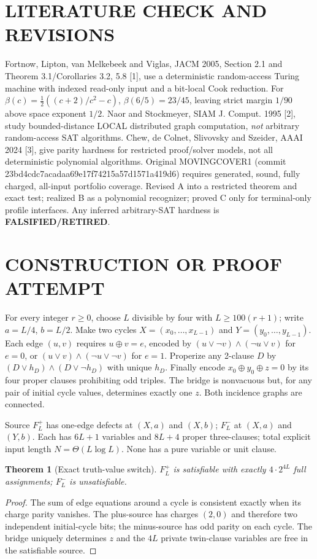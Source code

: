 \documentclass[11pt]{article}
\newtheorem{theorem}{Theorem}
\begin{document}
\section{LITERATURE CHECK AND REVISIONS}
Fortnow, Lipton, van Melkebeek and Viglas, JACM 2005, Section 2.1 and Theorem 3.1/Corollaries 3.2, 5.8 [1], use a deterministic random-access Turing machine with indexed read-only input and a bit-local Cook reduction. For $\beta(c)=\tfrac12((c+2)/c^2-c)$, $\beta(6/5)=23/45$, leaving strict margin $1/90$ above space exponent $1/2$. Naor and Stockmeyer, SIAM J. Comput. 1995 [2], study bounded-distance LOCAL distributed graph computation, \emph{not} arbitrary random-access SAT algorithms. Chew, de Colnet, Slivovsky and Szeider, AAAI 2024 [3], give parity hardness for restricted proof/solver models, not all deterministic polynomial algorithms. Original MOVINGCOVER1 (commit 23bd4cdc7acadaa69e17f74215a57d1571a419d6) requires generated, sound, fully charged, all-input portfolio coverage. Revised A into a restricted theorem and exact test; realized B as a polynomial recognizer; proved C only for terminal-only profile interfaces. Any inferred arbitrary-SAT hardness is \textbf{FALSIFIED/RETIRED}.

\section{CONSTRUCTION OR PROOF ATTEMPT}
For every integer $r\ge0$, choose $L$ divisible by four with $L\ge100(r+1)$; write $a=L/4$, $b=L/2$. Make two cycles $X=(x_0,\ldots,x_{L-1})$ and $Y=(y_0,\ldots,y_{L-1})$. Each edge $(u,v)$ requires $u\oplus v=e$, encoded by $(u\vee\neg v)\wedge(\neg u\vee v)$ for $e=0$, or $(u\vee v)\wedge(\neg u\vee\neg v)$ for $e=1$. Properize any 2-clause $D$ by $(D\vee h_D)\wedge(D\vee\neg h_D)$ with unique $h_D$. Finally encode $x_0\oplus y_0\oplus z=0$ by its four proper clauses prohibiting odd triples. The bridge is nonvacuous but, for any pair of initial cycle values, determines exactly one $z$. Both incidence graphs are connected.

Source $F_L^+$ has one-edge defects at $(X,a)$ and $(X,b)$; $F_L^-$ at $(X,a)$ and $(Y,b)$. Each has $6L+1$ variables and $8L+4$ proper three-clauses; total explicit input length $N=\Theta(L\log L)$. None has a pure variable or unit clause.

\begin{theorem}[Exact truth-value switch]
$F_L^+$ is satisfiable with exactly $4\cdot2^{4L}$ full assignments; $F_L^-$ is unsatisfiable.
\end{theorem}
\begin{proof}
The sum of edge equations around a cycle is consistent exactly when its charge parity vanishes. The plus-source has charges $(2,0)$ and therefore two independent initial-cycle bits; the minus-source has odd parity on each cycle. The bridge uniquely determines $z$ and the $4L$ private twin-clause variables are free in the satisfiable source.
\end{proof}
\end{document}
